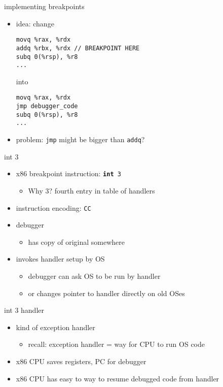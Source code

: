 \begin{frame}[fragile,label=implBreak]{implementing breakpoints}
\lstset{language=myasm,style=small}
\begin{itemize}
    \item idea: change
\begin{lstlisting}
movq %rax, %rdx
addq %rbx, %rdx // BREAKPOINT HERE
subq 0(%rsp), %r8
...
\end{lstlisting}
into
\begin{lstlisting}
movq %rax, %rdx
jmp debugger_code 
subq 0(%rsp), %r8
...
\end{lstlisting}
    \item<2> problem: {\tt jmp} might be bigger than {\tt addq}?
\end{itemize}
\end{frame}

\begin{frame}[fragile,label=implBreak2]{int 3}
    \begin{itemize}
    \item x86 breakpoint instruction: {\tt \textbf{int} 3}
        \begin{itemize}
        \item Why 3? fourth entry in table of handlers
        \end{itemize}
    \item {} instruction encoding: {\tt CC}
    \item debugger 
        \begin{itemize}
        \item has copy of original somewhere
        \end{itemize}
    \item invokes handler setup by OS
        \begin{itemize}
        \item debugger can ask OS to be run by handler
        \item or changes pointer to handler directly on old OSes
        \end{itemize}
    \end{itemize}
\end{frame}

\begin{frame}{int 3 handler}
    \begin{itemize}
    \item kind of exception handler
        \begin{itemize}
        \item recall: exception handler = way for CPU to run OS code
        \end{itemize}
    \item x86 CPU saves registers, PC for debugger
    \item x86 CPU has easy to way to resume debugged code from handler
    \end{itemize}
\end{frame}

